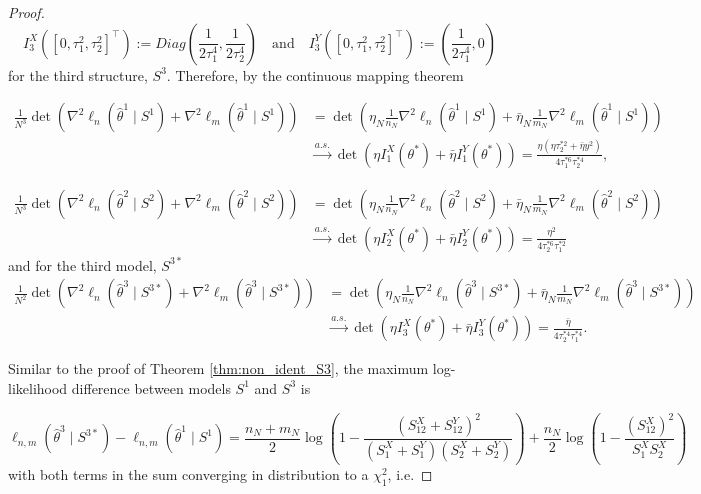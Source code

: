\documentclass[accepted]{uai2026} %
\newcommand{\tsone}{\tau_1^{*2}}
\newcommand{\tstwo}{\tau_2^{*2}}
\def\transpose{\intercal}
\theoremstyle{boldremark}
\begin{document}
\begin{proof}
    $$I_3^X([0, \tau_1^2, \tau_2^2]^\transpose) := Diag\left( \frac{1}{2\tau_1^4}, \frac{1}{2\tau_2^4}\right)\quad \text{and}\quad I_3^Y([0, \tau_1^2, \tau_2^2]^\transpose):=\left(\frac{1}{2\tau_1^4}, 0 \right)$$
    for the third structure, $S^3$. Therefore, by the continuous mapping theorem

    \begin{align}
        \label{eq:det_calc1}
        \nonumber \frac{1}{N^3} \det\left( \nabla^2 \ell_n(\hat{\theta}^1 \mid  S^1) + \nabla^2 \ell_m(\hat{\theta}^1 \mid  S^1) \right)  &=  \det\left( \eta_N\frac{1}{n_N}\nabla^2 \ell_n(\hat{\theta}^1  \mid S^1) + \bar{\eta}_N\frac{1}{m_N}\nabla^2 \ell_m(\hat{\theta}^1 \mid S^1) \right) \\
        & \xrightarrow{a.s.} \det \left( \eta I_1^X(\theta^*)+\bar{\eta}I_1^Y(\theta^*) \right) = \frac{\eta(\eta\tstwo+\bar{\eta}y^2)}{4\tau_1^{*6}\tau_2^{*4}},
    \end{align}
    
    \begin{align}
        \label{eq:det_calc2}
        \nonumber\frac{1}{N^3} \det\left( \nabla^2 \ell_n(\hat{\theta}^2 \mid  S^2) + \nabla^2 \ell_m(\hat{\theta}^2 \mid  S^2) \right) &= \det\left( \eta_N\frac{1}{n_N}\nabla^2 \ell_n(\hat{\theta}^2  \mid S^2) + \bar{\eta}_N\frac{1}{m_N}\nabla^2 \ell_m(\hat{\theta}^2 \mid S^2) \right)\\
        & \xrightarrow{a.s.} \det \left( \eta I_2^X(\theta^*)+\bar{\eta}I_2^Y(\theta^*) \right)  = \frac{\eta^2}{4\tau_2^{*6}\tsone}
    \end{align}
    and for the third model, $S^{3*}$
    \begin{align}
        \label{eq:det_calc3}
        \nonumber\frac{1}{N^2} \det\left( \nabla^2 \ell_n(\hat{\theta}^3 \mid  S^{3*}) + \nabla^2 \ell_m(\hat{\theta}^3 \mid  S^{3*}) \right) &= \det\left( \eta_N\frac{1}{n_N}\nabla^2 \ell_n(\hat{\theta}^3  \mid S^{3*}) + \bar{\eta}_N\frac{1}{m_N}\nabla^2 \ell_m(\hat{\theta}^3 \mid S^{3*}) \right)\\
        & \xrightarrow{a.s.} \det \left( \eta I_3^X(\theta^*)+\bar{\eta}I_3^Y(\theta^*) \right)   = \frac{\bar{\eta}}{4\tau_2^{*4}\tau_1^{*4}}.
    \end{align}
    
    Similar to the proof of Theorem \ref{thm:non_ident_S3}, the maximum log-likelihood difference between models $S^1$ and $S^3$ is 

    \begin{equation}
        \label{eq:log_lik_diff1-3}
        \ell_{n,m}(\hat{\theta}^3\mid S^{3*}) - \ell_{n,m}(\hat{\theta}^1\mid S^1) = \frac{n_N+m_N}{2}\log \left(1-\frac{(S_{12}^X+S_{12}^Y)^2}{(S_1^X+S_1^Y)(S_2^X+S_2^Y)} \right) + \frac{n_N}{2}\log \left(1-\frac{(S_{12}^X)^2}{S_1^XS_2^X} \right)
    \end{equation}
    with both terms in the sum converging in distribution to a $\chi^2_1$, i.e.


\end{proof}
\end{document}
